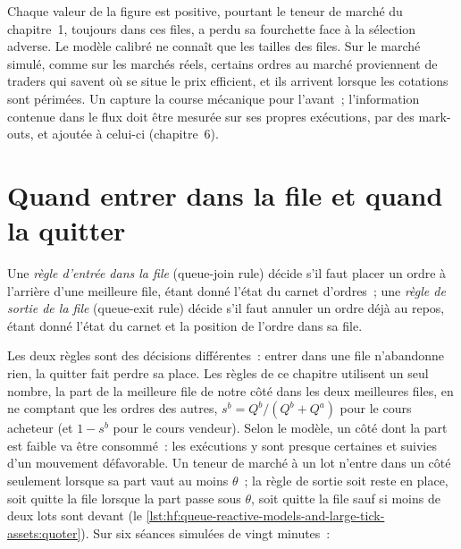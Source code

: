 \begin{remark}\label{rem:hf:queue-reactive-models-and-large-tick-assets:info}
Chaque valeur de la figure est positive, pourtant le teneur de marché du chapitre~1, toujours dans ces files, a perdu sa fourchette face à la sélection adverse. Le modèle calibré
ne connaît que les tailles des files. Sur le marché simulé, comme sur les marchés réels, certains ordres au marché proviennent de traders qui savent où se situe le prix efficient,
et ils arrivent lorsque les cotations sont périmées. Un  capture la course mécanique pour l'avant~; l'information contenue dans le flux doit être
mesurée sur ses propres exécutions, par des mark-outs, et ajoutée à celui-ci (chapitre~6).
\end{remark}

\section{Quand entrer dans la file et quand la quitter}

\begin{definition}\label{def:hf:queue-reactive-models-and-large-tick-assets:rules}
Une \emph{règle d'entrée dans la file} (queue-join rule) décide s'il faut placer un ordre à l'arrière d'une meilleure file, étant donné l'état du carnet d'ordres~; une
\emph{règle de sortie de la file} (queue-exit rule) décide s'il faut annuler un ordre déjà au repos, étant donné l'état du carnet et la position de l'ordre
dans sa file.
\end{definition}

Les deux règles sont des décisions différentes~: entrer dans une file n'abandonne rien, la quitter fait perdre sa place. Les règles de ce chapitre utilisent un seul nombre, la part de la meilleure
file de notre côté dans les deux meilleures files, en ne comptant que les ordres des autres, $s^b=Q^b/(Q^b+Q^a)$ pour le cours acheteur (et $1-s^b$ pour le cours vendeur). Selon le modèle, un côté
dont la part est faible va être consommé~: les exécutions y sont presque certaines et suivies d'un mouvement défavorable. Un teneur de marché à un lot n'entre dans un côté
seulement lorsque sa part vaut au moins $\theta$~; la règle de sortie soit reste en place, soit quitte la file lorsque la part passe sous $\theta$, soit quitte la file sauf si moins de
deux lots sont devant (le \cref{lst:hf:queue-reactive-models-and-large-tick-assets:quoter}). Sur six séances simulées de vingt minutes~:

